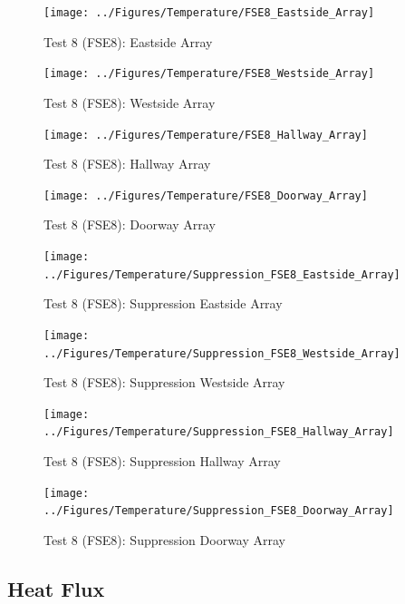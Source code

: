 \documentclass[12pt,oneside]{book}
\begin{document}
\begin{figure}[!ht]
	\texttt{[image: ../Figures/Temperature/FSE8\_Eastside\_Array]}
	\caption{Test 8 (FSE8): Eastside Array}
	\label{fig:Test_8_Eastside_Array}
\end{figure}

\begin{figure}[!ht]
	\texttt{[image: ../Figures/Temperature/FSE8\_Westside\_Array]}
	\caption{Test 8 (FSE8): Westside Array}
	\label{fig:Test_8_Westside_Array}
\end{figure}

\begin{figure}[!ht]
	\texttt{[image: ../Figures/Temperature/FSE8\_Hallway\_Array]}
	\caption{Test 8 (FSE8): Hallway Array}
	\label{fig:Test_8_Hallway_Array}
\end{figure}

\begin{figure}[!ht]
	\texttt{[image: ../Figures/Temperature/FSE8\_Doorway\_Array]}
	\caption{Test 8 (FSE8): Doorway Array}
	\label{fig:Test_8_Doorway_Array}
\end{figure}

\begin{figure}[!ht]
	\texttt{[image: ../Figures/Temperature/Suppression\_FSE8\_Eastside\_Array]}
	\caption{Test 8 (FSE8): Suppression Eastside Array}
	\label{fig:Test_8_Suppression_Eastside_Array}
\end{figure}

\begin{figure}[!ht]
	\texttt{[image: ../Figures/Temperature/Suppression\_FSE8\_Westside\_Array]}
	\caption{Test 8 (FSE8): Suppression Westside Array}
	\label{fig:Test_8_Suppression_Westside_Array}
\end{figure}

\begin{figure}[!ht]
	\texttt{[image: ../Figures/Temperature/Suppression\_FSE8\_Hallway\_Array]}
	\caption{Test 8 (FSE8): Suppression Hallway Array}
	\label{fig:Test_8_Suppression_Hallway_Array}
\end{figure}

\begin{figure}[!ht]
	\texttt{[image: ../Figures/Temperature/Suppression\_FSE8\_Doorway\_Array]}
	\caption{Test 8 (FSE8): Suppression Doorway Array}
	\label{fig:Test_8_Suppression_Doorway_Array}
\end{figure}

\subsection{Heat Flux}
\label{subsec:Heat_Flux}
\end{document}
